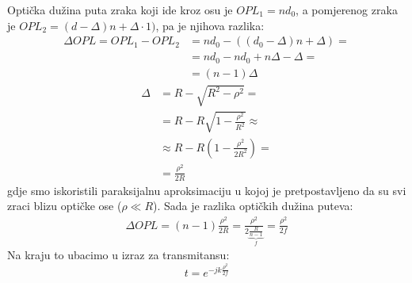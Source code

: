 \documentclass[fleqn]{report}
\begin{document}
Optička dužina puta zraka koji ide kroz osu je $OPL_1 = nd_0$, a pomjerenog zraka je $OPL_2 = (d - \Delta)n + \Delta \cdot 1)$, pa je njihova razlika:
\begin{align*}
    \Delta OPL = OPL_1 - OPL_2 & = nd_0 - ((d_0 - \Delta)n + \Delta) = \\
                               & = nd_0 - nd_0 + n\Delta - \Delta =    \\
                               & = (n - 1)\Delta
\end{align*}
\begin{align*}
    \Delta & = R - \sqrt{R^2 - \rho^2} =                         \\
           & = R - R\sqrt{1 - \frac{\rho^2}{R^2}} \approx        \\
           & \approx R - R\left(1 - \frac{\rho^2}{2R^2}\right) = \\
           & = \frac{\rho^2}{2R}
\end{align*}
gdje smo iskoristili paraksijalnu aproksimaciju u kojoj je pretpostavljeno da su svi zraci blizu optičke ose ($\rho \ll R$).
Sada je razlika optičkih dužina puteva:
\begin{align*}
    \Delta OPL = (n - 1) \frac{\rho^2}{2R} = \frac{\rho^2}{2\underbrace{\frac{R}{n - 1}}_f} = \frac{\rho^2}{2f}
\end{align*}
Na kraju to ubacimo u izraz za transmitansu:
\begin{equation*}
    t = e^{-jk\frac{\rho^2}{2f}}
\end{equation*}
\end{document}
